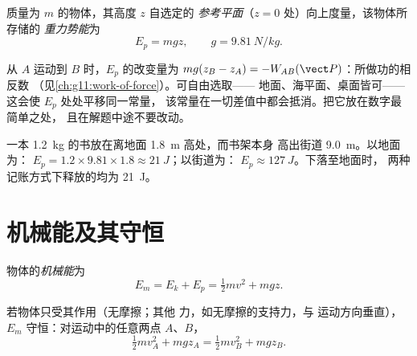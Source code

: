 \begin{definition}[重力势能]\label{def:g11:mechanical-energy:potential}
质量为 $m$ 的物体，其高度 $z$ 自选定的
\emph{参考平面}（$z = 0$ 处）向上度量，该物体所存储的
\emph{重力势能}为
\[
E_p = m g z, \qquad g = \qty{9.81}{N/kg}.
\]
\end{definition}

\begin{remark}[只有差值有意义]\label{rem:g11:mechanical-energy:reference}
从 $A$ 运动到 $B$ 时，$E_p$ 的改变量为 $mg(z_B - z_A) =
-W_{AB}(\vect P)$：所做功的相反数
（见\cref{ch:g11:work-of-force}）。可自由选取——
地面、海平面、桌面皆可——这会使 $E_p$ 处处平移同一常量，
该常量在一切差值中都会抵消。把它放在数字最简单之处，
且在解题中途不要改动。
\end{remark}

\begin{example}[书架上的书]\label{ex:g11:mechanical-energy:shelf}
一本 \qty{1.2}{kg} 的书放在离地面 \qty{1.8}{m} 高处，而书架本身
高出街道 \qty{9.0}{m}。以地面为：
$E_p = 1.2 \times 9.81 \times 1.8 \approx \qty{21}{J}$；以街道为：
$E_p \approx \qty{127}{J}$。下落至地面时，
两种记账方式下释放的均为 \qty{21}{J}。
\end{example}

\section{机械能及其守恒}

\begin{definition}[机械能]\label{def:g11:mechanical-energy:em}
物体的\emph{机械能}为
\[
E_m = E_k + E_p = \tfrac12 m v^2 + m g z .
\]
\end{definition}

\begin{theorem}[机械能守恒]\label{thm:g11:mechanical-energy:conservation}
若物体只受其作用（无摩擦；其他
力，如无摩擦的支持力，与
运动方向垂直），$E_m$ 守恒：对运动中的任意两点 $A$、$B$，
\[
\tfrac12 m v_A^2 + m g z_A = \tfrac12 m v_B^2 + m g z_B .
\]
\end{theorem}

